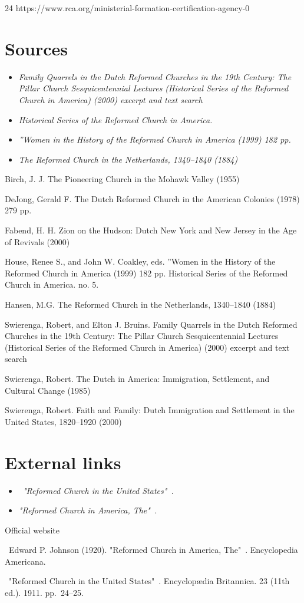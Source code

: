 24 https://www.rca.org/ministerial-formation-certification-agency-0

\section{Sources}\label{sources}

\begin{itemize}
\item
  \emph{Family Quarrels in the Dutch Reformed Churches in the 19th
  Century: The Pillar Church Sesquicentennial Lectures (Historical
  Series of the Reformed Church in America) (2000) excerpt and text
  search}
\item
  \emph{Historical Series of the Reformed Church in America.}
\item
  \emph{''Women in the History of the Reformed Church in America (1999)
  182 pp.}
\item
  \emph{The Reformed Church in the Netherlands, 1340--1840 (1884)}
\end{itemize}

Birch, J. J. The Pioneering Church in the Mohawk Valley (1955)

DeJong, Gerald F. The Dutch Reformed Church in the American Colonies
(1978) 279 pp.

Fabend, H. H. Zion on the Hudson: Dutch New York and New Jersey in the
Age of Revivals (2000)

House, Renee S., and John W. Coakley, eds. ''Women in the History of the
Reformed Church in America (1999) 182 pp. Historical Series of the
Reformed Church in America. no. 5.

Hansen, M.G. The Reformed Church in the Netherlands, 1340--1840 (1884)

Swierenga, Robert, and Elton J. Bruins. Family Quarrels in the Dutch
Reformed Churches in the 19th Century: The Pillar Church
Sesquicentennial Lectures (Historical Series of the Reformed Church in
America) (2000) excerpt and text search

Swierenga, Robert. The Dutch in America: Immigration, Settlement, and
Cultural Change (1985)

Swierenga, Robert. Faith and Family: Dutch Immigration and Settlement in
the United States, 1820--1920 (2000)

\section{External links}\label{external-links}

\begin{itemize}
\item
  \emph{~"Reformed Church in the United States"~.}
\item
  \emph{"Reformed Church in America, The"~.}
\end{itemize}

Official website

~Edward P. Johnson (1920). "Reformed Church in America, The"~.
Encyclopedia Americana.

~"Reformed Church in the United States"~. Encyclopædia Britannica. 23
(11th ed.). 1911. pp.~24--25.
